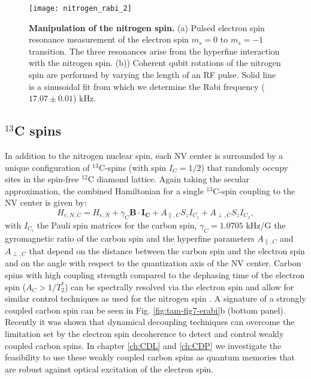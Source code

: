 \begin{figure*}
	\centering
	\texttt{[image: nitrogen\_rabi\_2]}
	\caption{\label{fig:tam-fig10-nrabi} \textbf{Manipulation of the nitrogen spin.} (a) Pulsed electron spin resonance measurement of the electron spin $m_s = 0$ to $m_s = -1$ transition. The three resonances arise from the hyperfine interaction with the nitrogen spin. (b)) Coherent qubit rotations of the nitrogen spin are performed by varying the length of an RF pulse. Solid line is a sinusoidal fit from which we determine the Rabi frequency ($17.07 \pm 0.01$) kHz.}
\end{figure*}

\subsection{$^{13}$C spins}
In addition to the nitrogen nuclear spin, each NV center is surrounded by a unique configuration of $^{13}$C-spins (with spin $I_C = 1/2$) that randomly occupy sites in the spin-free $^{12}$C diamond lattice. Again taking the secular approximation, the combined Hamiltonian for a single $^{13}$C-spin coupling to the NV center is given by:
\begin{equation}
H_{e,N,C} = H_{e,N} + \gamma_C \mathbf{B} \cdot \mathbf{I_C} + A_{\parallel,C} S_z I_{C_z} + A_{\perp,C} S_z I_{C_x},
\end{equation}
with $I_{C_i}$ the Pauli spin matrices for the carbon spin, $\gamma_C = 1.0705$ kHz/G the gyromagnetic ratio of the carbon spin and the hyperfine parameters $A_{\parallel,C}$ and $A_{\perp,C}$ that depend on the distance between the carbon spin and the electron spin and on the angle with respect to the quantization axis of the NV center. Carbon spins with high coupling strength compared to the dephasing time of the electron spin ($A_C > 1/T_2^*$) can be spectrally resolved via the electron spin and allow for similar control techniques as used for the nitrogen spin \cite{Jelezko_Phys.Rev.Lett._2004,Dutt_Science_2007,Neumann_Science_2008,Jiang_Science_2009,Smeltzer_Phys.Rev.A_2009}. A signature of a strongly coupled carbon spin can be seen in Fig. \ref{fig:tam-fig7-erabi}b (bottom panel). Recently it was shown that dynamical decoupling techniques can overcome the limitation set by the electron spin decoherence to detect\cite{Taminiau_Phys.Rev.Lett._2012,Kolkowitz_Phys.Rev.Lett._2012,Zhao_NatNano_2012} and control\cite{Taminiau_NatNano_2014} weakly coupled carbon spins. In chapter \ref{ch:CDL} and \ref{ch:CDP} we investigate the feasibility to use these weakly coupled carbon spins as quantum memories that are robust against optical excitation of the electron spin.

